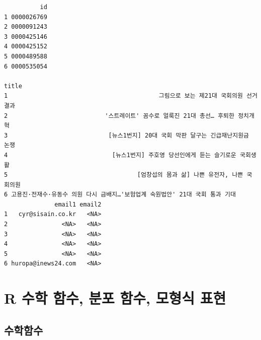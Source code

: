 \documentclass[
  11pt,
]{krantz}
\newenvironment{Shaded}{\begin{snugshade}}{\end{snugshade}}
\newcommand{\CommentTok}[1]{\textcolor[rgb]{0.37,0.37,0.37}{\textit{#1}}}
\begin{document}
\begin{verbatim}
          id
1 0000026769
2 0000091243
3 0000425146
4 0000425152
5 0000489588
6 0000535054
                                                                             title
1                                          그림으로 보는 제21대 국회의원 선거 결과
2                           '스트레이트' 꼼수로 얼룩진 21대 총선… 후퇴한 정치개혁
3                            [뉴스1번지] 20대 국회 막판 달구는 긴급재난지원금 논쟁
4                             [뉴스1번지] 주호영 당선인에게 듣는 슬기로운 국회생활
5                                    [엄창섭의 몸과 삶] 나쁜 유전자, 나쁜 국회의원
6 고용진·전재수·유동수 의원 다시 금배지…'보험업계 숙원법안' 21대 국회 통과 기대
              email1 email2
1   cyr@sisain.co.kr   <NA>
2               <NA>   <NA>
3               <NA>   <NA>
4               <NA>   <NA>
5               <NA>   <NA>
6 huropa@inews24.com   <NA>
\end{verbatim}

\begin{Shaded}
\end{Shaded}

\normalsize

\hypertarget{r-uxc218uxd559-uxd568uxc218-uxbd84uxd3ec-uxd568uxc218-uxbaa8uxd615uxc2dd-uxd45cuxd604}{%
\chapter{R 수학 함수, 분포 함수, 모형식 표현}\label{r-uxc218uxd559-uxd568uxc218-uxbd84uxd3ec-uxd568uxc218-uxbaa8uxd615uxc2dd-uxd45cuxd604}}

\hypertarget{uxc218uxd559uxd568uxc218}{%
\section{수학함수}\label{uxc218uxd559uxd568uxc218}}
\end{document}
